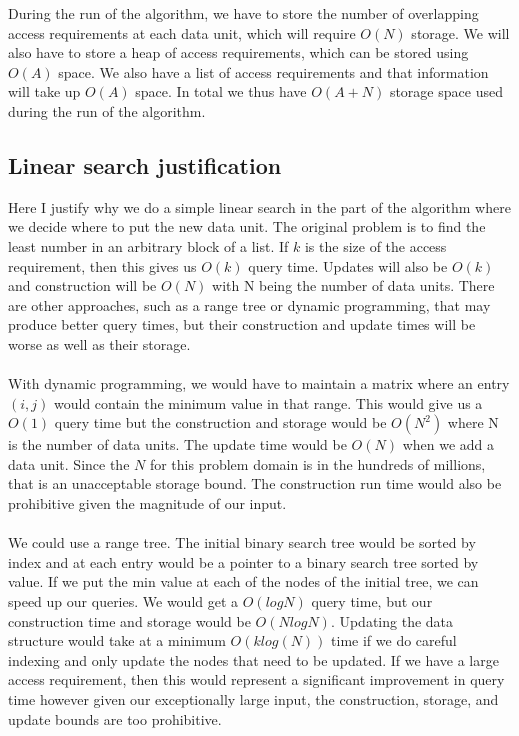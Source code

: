 \documentclass[conference]{acmsiggraph}
\begin{document}
During the run of the algorithm, we have to store the number of overlapping access requirements at each data unit, which will require $O(N)$ storage. We will also have to store a heap of access requirements, which can be stored using $O(A)$ space. We also have a list of access requirements and that information will take up $O(A)$ space. In total we thus have $O(A + N)$ storage space used during the run of the algorithm. 


\subsection{Linear search justification}

Here I justify why we do a simple linear search in the part of the algorithm where we decide where to put the new data unit. The original problem is to find the least number in an arbitrary block of a list. If $k$ is the size of the access requirement, then this gives us $O(k)$ query time. Updates will also be $O(k)$ and construction will be $O(N)$ with N being the number of data units. There are other approaches, such as a range tree or dynamic programming, that may produce better query times, but their construction and update times will be worse as well as their storage. \\
\\
With dynamic programming, we would have to maintain a matrix where an entry $(i,j)$ would contain the minimum value in that range. This would give us a $O(1)$ query time but the construction and storage would be $O(N^2)$ where N is the number of data units. The update time would be $O(N)$ when we add a data unit. Since the $N$ for this problem domain is in the hundreds of millions, that is an unacceptable storage bound. The construction run time would also be prohibitive given the magnitude of our input. \\
\\
We could use a range tree. The initial binary search tree would be sorted by index and at each entry would be a pointer to a binary search tree sorted by value. If we put the min value at each of the nodes of the initial tree, we can speed up our queries. We would get a $O(log N)$ query time, but our construction time and storage would be $O(N log N)$. Updating the data structure would take at a minimum $O(k log(N))$ time if we do careful indexing and only update the nodes that need to be updated. If we have a large access requirement, then this would represent a significant improvement in query time however given our exceptionally large input, the construction, storage, and update bounds are too prohibitive.  
\end{document}
